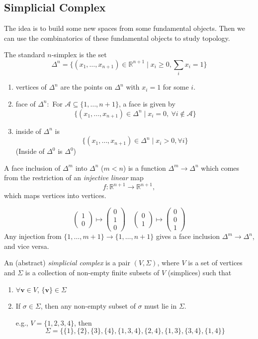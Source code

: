 \subsection{Simplicial Complex}
The idea is to build some new spaces from some fundamental objects.
Then we can use the combinatorics of these fundamental objects to study topology.

\begin{definition}[$n$-simplex]
The standard $n$-simplex is the set
\[
\Delta^n = \{(x_1,\dots,x_{n+1})\in\mathbb{R}^{n+1}\mid x_i\ge0, \sum_{i}x_i=1\}
\]
\begin{enumerate}
\item
vertices of $\Delta^n$ are the points on $\Delta^n$ with
$x_i=1$ for some $i$.
\item
face of $\Delta^n:$ For $\mathcal{A}\subseteq\{1,\dots,n+1\}$, a face is given by
\[
\{(x_1,\dots,x_{n+1})\in\Delta^n\mid x_i=0,\ \forall i\notin\mathcal{A}\}
\]
\item
inside of $\Delta^n$ is 
\[
\{(x_1,\dots,x_{n+1})\in\Delta^n\mid x_i>0,\forall i\}
\]
(Inside of $\Delta^0$ is $\Delta^0$)
\end{enumerate}
\end{definition}

\begin{definition}
A face inclusion of $\Delta^m$ into $\Delta^n$ ($m<n$) is a function $\Delta^m\to\Delta^n$ which comes from the restriction of an \emph{injective linear} map
\[
f:\mathbb{R}^{n+1}\to\mathbb{R}^{n+1},
\]
which maps vertices into vertices.
\end{definition}
\[
\begin{pmatrix}
1\\0
\end{pmatrix}\mapsto\begin{pmatrix}
0\\1\\0
\end{pmatrix}\quad
\begin{pmatrix}
0\\1
\end{pmatrix}\mapsto\begin{pmatrix}
0\\0\\1
\end{pmatrix}
\]
Any injection from $\{1,\dots,m+1\}\to\{1,\dots,n+1\}$ gives a face inclusion $\Delta^m\to\Delta^n$, and vice versa.

\begin{definition}
An (abstract) \emph{simplicial complex} is a pair $(V,\Sigma)$,
where $V$ is a set of vertices and $\Sigma$ is a collection of non-empty finite subsets of $V$ (simplices) such that
\begin{enumerate}
\item
$\forall \bm v\in V$, $\{\bm v\}\in\Sigma$
\item
If $\sigma\in\Sigma$, then any non-empty subset of $\sigma$ must lie in $\Sigma$.

e.g., $V=\{1,2,3,4\}$, then 
\[
\Sigma=\{\{1\},\{2\},\{3\},\{4\},\{1,3,4\},\{2,4\},\{1,3\},\{3,4\},\{1,4\}\}
\]
\end{enumerate}
\end{definition}

